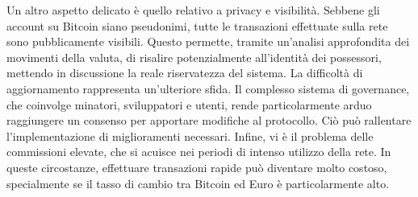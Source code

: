 Un altro aspetto delicato è quello relativo a privacy e visibilità. Sebbene gli account su Bitcoin siano pseudonimi, tutte le transazioni effettuate sulla rete sono pubblicamente visibili. Questo permette, tramite un'analisi approfondita dei movimenti della valuta, di risalire potenzialmente all'identità dei possessori, mettendo in discussione la reale riservatezza del sistema.
La difficoltà di aggiornamento rappresenta un'ulteriore sfida. Il complesso sistema di governance, che coinvolge minatori, sviluppatori e utenti, rende particolarmente arduo raggiungere un consenso per apportare modifiche al protocollo. Ciò può rallentare l'implementazione di miglioramenti necessari.
Infine, vi è il problema delle commissioni elevate, che si acuisce nei periodi di intenso utilizzo della rete. In queste circostanze, effettuare transazioni rapide può diventare molto costoso, specialmente se il tasso di cambio tra Bitcoin ed Euro è particolarmente alto.

